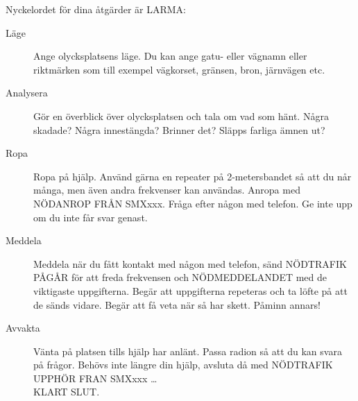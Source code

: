 Nyckelordet för dina åtgärder är LARMA:

\begin{description}
\item[Läge] Ange olycksplatsens läge. Du kan ange gatu- eller vägnamn eller riktmärken som
  till exempel vägkorset, gränsen, bron, järnvägen etc.
\item[Analysera] Gör en överblick över olycksplatsen och tala om vad som hänt.
  Några skadade? Några innestängda? Brinner det? Släpps farliga ämnen ut?
\item[Ropa] Ropa på hjälp. Använd gärna en repeater på 2-metersbandet så att du når många,
  men även andra frekvenser kan användas. Anropa med NÖDANROP FRÅN SMXxxx.
  Fråga efter någon med telefon. Ge inte upp om du inte får svar genast.
\item[Meddela] Meddela när du fått kontakt med någon med telefon, sänd NÖDTRAFIK PÅGÅR
  för att freda frekvensen och NÖDMEDDELANDET med de viktigaste uppgifterna.
  Begär att uppgifterna repeteras och ta löfte på att de sänds vidare.
  Begär att få veta när så har skett. Påminn annars!
\item[Avvakta] Vänta på platsen tills hjälp har anlänt.
  Passa radion så att du kan svara på frågor. Behövs inte längre din hjälp, avsluta då med
  NÖDTRAFIK UPPHÖR FRAN SMXxxx \dots \\
  KLART SLUT.
\end{description}
